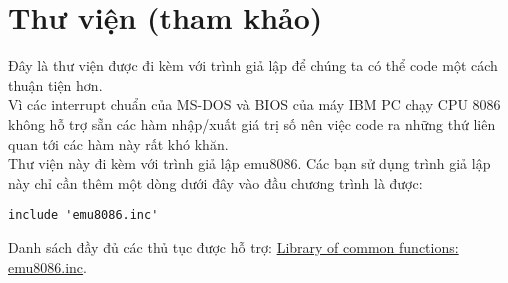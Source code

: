 \documentclass[main.tex]{subfiles}
\begin{document}
\section{Thư viện  (tham khảo)} \label{sec:emu8086}
Đây là thư viện được đi kèm với trình giả lập  để chúng ta có thể code một cách thuận tiện hơn.\\
Vì các interrupt chuẩn của MS-DOS và BIOS của máy IBM PC chạy CPU 8086 không hỗ trợ sẵn các hàm nhập/xuất giá trị số nên việc code ra những thứ liên quan tới các hàm này rất khó khăn. \\
Thư viện này đi kèm với trình giả lập emu8086. Các bạn sử dụng trình giả lập này chỉ cần thêm một dòng dưới đây vào đầu chương trình là được:
\begin{verbatim}
include 'emu8086.inc'
\end{verbatim}
Danh sách đầy đủ các thủ tục được hỗ trợ: \href{https://jbwyatt.com/253/emu/asm_tutorial_05.html}{Library of common functions: emu8086.inc}.
\end{document}
